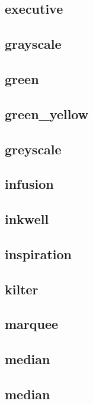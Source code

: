 \subsection{\ttfamily executive}
\newpage
\subsection{\ttfamily grayscale}
\newpage
\subsection{\ttfamily green}
\newpage
\subsection{\ttfamily green\_yellow}
\newpage
\subsection{\ttfamily greyscale}
\newpage
\subsection{\ttfamily infusion}
\newpage
\subsection{\ttfamily inkwell}
\newpage
\subsection{\ttfamily inspiration}
\newpage
\subsection{\ttfamily kilter}
\newpage
\subsection{\ttfamily marquee}
\newpage
\subsection{\ttfamily median}
\newpage
\subsection{\ttfamily median}
\newpage
